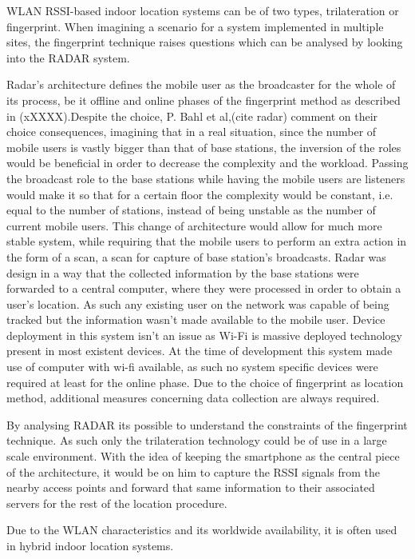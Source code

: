 \begin{description}
	WLAN \ac{RSSI}-based indoor location systems can be of two types, trilateration or fingerprint.
	When imagining a scenario for a system implemented in multiple sites, the fingerprint technique raises questions which can be analysed by looking into the RADAR system. 

	Radar's architecture defines the mobile user as the broadcaster for the whole of its process, be it offline and online phases of the fingerprint method as described in (xXXXX).Despite the choice, P. Bahl et al,(cite radar) comment on their choice consequences, imagining that in a real situation, since the number of mobile users is vastly bigger than that of base stations, the inversion of the roles would be beneficial in order to decrease the complexity and the workload. Passing the broadcast role to the base stations while having the mobile users are listeners would make it so that for a certain floor the complexity would be constant, i.e. equal to the number of stations, instead of being unstable as the number of current mobile users. This change of architecture would allow for much more stable system, while requiring that the mobile users to perform an extra action in the form of a scan, a scan for capture of base station's broadcasts. Radar was design in a way that the collected information by the base stations were forwarded to a central computer, where they were processed in order to obtain a user's location. As such any existing user on the network was capable of being tracked but the information wasn't made available to the mobile user. Device deployment in this system isn't an issue as Wi-Fi is massive deployed technology present in most existent devices. At the time of development this system made use of computer with wi-fi available, as such no system specific devices were required at least for the online phase. Due to the choice of fingerprint as location method, additional measures concerning data collection are always required.

	By analysing RADAR its possible to understand the constraints of the fingerprint technique. As such only the trilateration technology could be of use in a large scale environment. With the idea of keeping the smartphone as the central piece of the  architecture, it would be on him to capture the \ac{RSSI} signals from the nearby access points and forward that same information to their associated servers for the rest of the location procedure.

	Due to the WLAN characteristics and its worldwide availability, it is often used in hybrid indoor location systems. 


\end{description}
